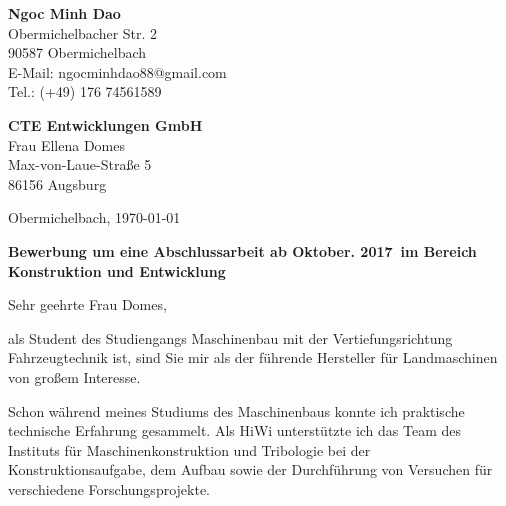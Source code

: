 \documentclass[11pt,a4paper]{letter}
\newcommand{\FirmaName}{CTE Entwicklungen GmbH}
\newcommand{\FirmaAdresseLineOne}{Max-von-Laue-Straße 5}
\newcommand{\FirmaAdresseLineTwo}{86156 Augsburg}
\newcommand{\JobName}{Konstruktion und Entwicklung}
\newcommand{\JobRefNummer}{WO 71030}
\newcommand{\AnsprechpartnerVoll}{Frau Ellena Domes}
\newcommand{\Ansprechpartner}{Maier}
\newcommand{\Ansprechpartnerin}{Domes}
\newcommand{\Beginntermin}{Oktober. 2017}
\begin{document}
\pagestyle{empty}

\begin{flushleft}
    \textbf{Ngoc Minh Dao}\\
    Obermichelbacher Str. 2\\
    90587 Obermichelbach\\
    E-Mail: ngocminhdao88@gmail.com\\
    Tel.: (+49) 176 74561589
\end{flushleft}

\begin{flushleft}
    \textbf{\FirmaName}\\
    \AnsprechpartnerVoll\\
    \FirmaAdresseLineOne\\
    \FirmaAdresseLineTwo\\
\end{flushleft}

\begin{flushright}
    Obermichelbach, \today
\end{flushright}

\textbf{Bewerbung um eine Abschlussarbeit ab \Beginntermin~im Bereich \JobName}\\
\vspace{1em}

Sehr geehrte Frau \Ansprechpartnerin,

als Student des Studiengangs Maschinenbau mit der Vertiefungsrichtung Fahrzeugtechnik ist, sind Sie mir als der führende Hersteller für Landmaschinen von großem Interesse.

Schon während meines Studiums des Maschinenbaus konnte ich praktische technische Erfahrung gesammelt.
Als HiWi unterstützte ich das Team des Instituts für Maschinenkonstruktion und Tribologie bei der Konstruktionsaufgabe, dem Aufbau sowie der Durchführung von Versuchen für verschiedene Forschungsprojekte.

\end{document}
